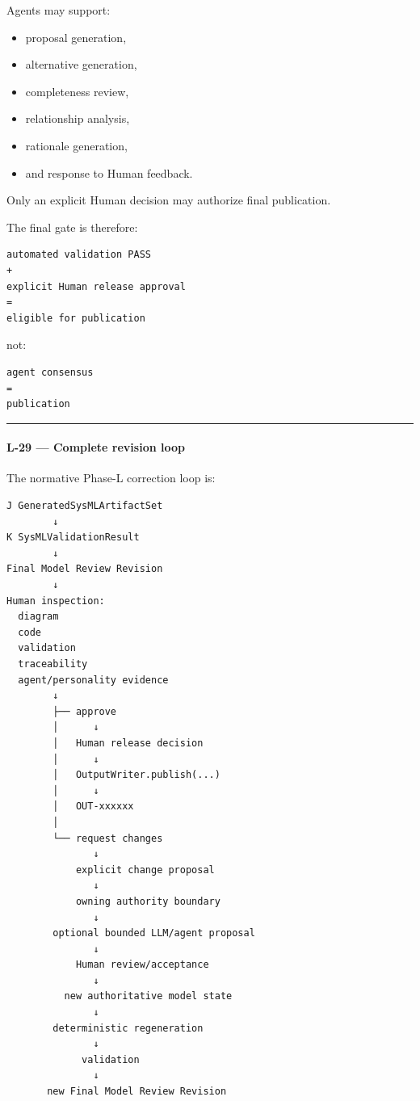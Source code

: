 Agents may support:

\begin{itemize}
\tightlist
\item
  proposal generation,
\item
  alternative generation,
\item
  completeness review,
\item
  relationship analysis,
\item
  rationale generation,
\item
  and response to Human feedback.
\end{itemize}

Only an explicit Human decision may authorize final publication.

The final gate is therefore:

\begin{verbatim}
automated validation PASS
+
explicit Human release approval
=
eligible for publication
\end{verbatim}

not:

\begin{verbatim}
agent consensus
=
publication
\end{verbatim}

\begin{center}\rule{0.5\linewidth}{0.5pt}\end{center}

\hypertarget{l-29--complete-revision-loop}{%
\paragraph{L-29 --- Complete revision loop}\label{l-29--complete-revision-loop}}

The normative Phase-L correction loop is:

\begin{verbatim}
J GeneratedSysMLArtifactSet
        ↓
K SysMLValidationResult
        ↓
Final Model Review Revision
        ↓
Human inspection:
  diagram
  code
  validation
  traceability
  agent/personality evidence
        ↓
        ├── approve
        │      ↓
        │   Human release decision
        │      ↓
        │   OutputWriter.publish(...)
        │      ↓
        │   OUT-xxxxxx
        │
        └── request changes
               ↓
            explicit change proposal
               ↓
            owning authority boundary
               ↓
        optional bounded LLM/agent proposal
               ↓
            Human review/acceptance
               ↓
          new authoritative model state
               ↓
        deterministic regeneration
               ↓
             validation
               ↓
       new Final Model Review Revision
\end{verbatim}

